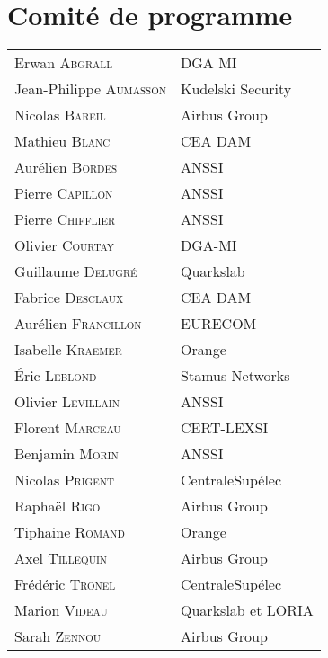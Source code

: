 \section*{Comité de programme}
\begin{tabular}{@{}p{5cm}@{}p{6.5cm}@{}}
  Erwan \textsc{Abgrall}          & DGA MI                                       \\
  Jean-Philippe \textsc{Aumasson} & Kudelski Security                            \\
  Nicolas \textsc{Bareil}         & Airbus Group                                 \\
  Mathieu \textsc{Blanc}          & CEA DAM                                      \\
  Aurélien \textsc{Bordes}        & ANSSI                                        \\
  Pierre   \textsc{Capillon}      & ANSSI                                        \\
  Pierre   \textsc{Chifflier}     & ANSSI                                        \\
  Olivier  \textsc{Courtay}       & DGA-MI                                       \\
  Guillaume \textsc{Delugré}      & Quarkslab                                    \\
  Fabrice \textsc{Desclaux}       & CEA DAM                                      \\
  Aurélien \textsc{Francillon}    & EURECOM                                      \\
  Isabelle \textsc{Kraemer}       & Orange                                       \\
  Éric \textsc{Leblond}           & Stamus Networks                              \\
  Olivier \textsc{Levillain}      & ANSSI                                        \\
  Florent \textsc{Marceau}        & CERT-LEXSI                                   \\
  Benjamin \textsc{Morin}         & ANSSI                                        \\
  Nicolas  \textsc{Prigent}       & CentraleSup\'elec                            \\
  Raphaël \textsc{Rigo}           & Airbus Group                                 \\
  Tiphaine \textsc{Romand}        & Orange                                       \\
  Axel \textsc{Tillequin}         & Airbus Group                                 \\
  Fr\'ed\'eric  \textsc{Tronel}   & CentraleSup\'elec                            \\
  Marion \textsc{Videau}          & Quarkslab et LORIA                           \\
  Sarah \textsc{Zennou}           & Airbus Group                                 \\
\end{tabular}

